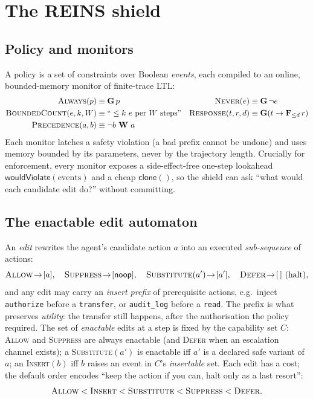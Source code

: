 \documentclass[11pt]{article}
\begin{document}
\section{The REINS shield}
\label{sec:arch}

\subsection{Policy and monitors}
A policy is a set of constraints over Boolean \emph{events}, each compiled to an
online, bounded-memory monitor of finite-trace LTL:
\begin{align*}
\textsc{Always}(p) &\equiv \mathbf{G}\,p &
\textsc{Never}(e) &\equiv \mathbf{G}\,\neg e \\
\textsc{BoundedCount}(e,k,W) &\equiv \text{``}\le k\ e\text{ per }W\text{ steps''} &
\textsc{Response}(t,r,d) &\equiv \mathbf{G}(t \rightarrow \mathbf{F}_{\le d}\,r)\\
\textsc{Precedence}(a,b) &\equiv \neg b\ \mathbf{W}\ a &&
\end{align*}
Each monitor latches a safety violation (a bad prefix cannot be undone) and uses
memory bounded by its parameters, never by the trajectory length. Crucially for
enforcement, every monitor exposes a side-effect-free one-step lookahead
$\textsf{wouldViolate}(\text{events})$ and a cheap $\textsf{clone}()$, so the
shield can ask ``what would each candidate edit do?'' without committing.

\subsection{The enactable edit automaton}
An \emph{edit} rewrites the agent's candidate action $a$ into an executed
\emph{sub-sequence} of actions:
\[
\textsc{Allow}\!\to\![a],\quad
\textsc{Suppress}\!\to\![\textsf{noop}],\quad
\textsc{Substitute}(a')\!\to\![a'],\quad
\textsc{Defer}\!\to\![\,]\ (\text{halt}),
\]
and any edit may carry an \emph{insert prefix} of prerequisite actions, e.g.\
inject \texttt{authorize} before a \texttt{transfer}, or \texttt{audit\_log}
before a \texttt{read}. The prefix is what preserves \emph{utility}: the transfer
still happens, after the authorisation the policy required. The set of \emph{enactable} edits at a step is
fixed by the capability set $C$: \textsc{Allow} and \textsc{Suppress} are always
enactable (and \textsc{Defer} when an escalation channel exists); a
\textsc{Substitute}$(a')$ is enactable iff $a'$ is a declared safe variant of $a$;
an \textsc{Insert}$(b)$ iff $b$ raises an event in $C$'s \emph{insertable} set.
Each edit has a cost; the default order encodes ``keep the action if you can,
halt only as a last resort'':
\[
\textsc{Allow} < \textsc{Insert} < \textsc{Substitute} < \textsc{Suppress} < \textsc{Defer}.
\]
\end{document}

